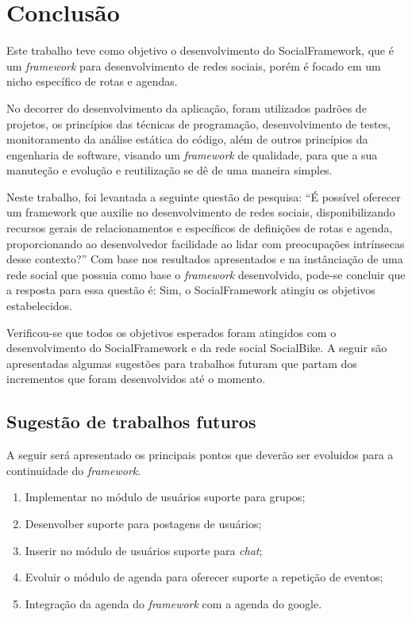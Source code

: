 \chapter{Conclusão}
\label{chapter:Conclusao}
Este trabalho teve como objetivo o desenvolvimento do SocialFramework, que é um \textit{framework} para desenvolvimento de redes sociais, porém é focado em um nicho específico de rotas e agendas.

No decorrer do desenvolvimento da aplicação, foram utilizados padrões de projetos, os princípios das técnicas de programação, desenvolvimento de testes, monitoramento da análise estática do código, além de outros princípios da engenharia de software, visando um \textit{framework} de qualidade, para que a sua manuteção e evolução e reutilização se dê de uma maneira simples.

Neste trabalho, foi levantada a seguinte questão de pesquisa: ``É possível oferecer um framework que auxilie no desenvolvimento de redes sociais, disponibilizando recursos gerais de relacionamentos e específicos de definições de rotas e agenda, proporcionando ao desenvolvedor facilidade ao lidar com preocupações intrínsecas desse contexto?'' Com base nos resultados apresentados e na instânciação de uma rede social que possuia como base o \textit{framework} desenvolvido, pode-se concluir que a resposta para essa questão é: Sim, o SocialFramework atingiu os objetivos estabelecidos.

Verificou-se que todos os objetivos esperados foram atingidos com o desenvolvimento do SocialFramework e da rede social SocialBike. A seguir são apresentadas algumas sugestões para trabalhos futuram que partam dos incrementos que foram desenvolvidos até o momento.

\section{Sugestão de trabalhos futuros}

A seguir será apresentado os principais pontos que deverão ser evoluidos para a continuidade do \textit{framework}.

\begin{enumerate}
	\item Implementar no módulo de usuários suporte para grupos;
	\item Desenvolber suporte para postagens de usuários;
	\item Inserir no módulo de usuários suporte para \textit{chat};
	\item Evoluir o módulo de agenda para oferecer suporte a repetição de eventos;
	\item Integração da agenda do \textit{framework} com a agenda do google.
\end{enumerate}
